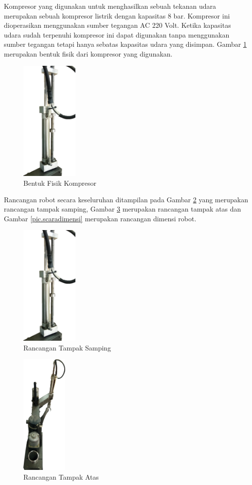 Kompresor yang digunakan untuk menghasilkan sebuah tekanan udara merupakan sebuah kompresor listrik dengan kapasitas 8 bar. Kompresor ini dioperasikan menggunakan sumber tegangan AC 220 Volt. Ketika kapasitas udara sudah terpenuhi kompresor ini dapat digunakan tanpa menggunakan sumber tegangan tetapi hanya sebatas kapasitas udara yang disimpan. Gambar \ref{pic.kompresor} merupakan bentuk fisik dari kompresor yang digunakan.
\begin{figure}[H]
	\centering
	\includegraphics[height=6cm]{gambar/penuamticsementara.jpg}
	\caption{Bentuk Fisik Kompresor}
	\label{pic.kompresor}
\end{figure}

Rancangan robot secara keseluruhan ditampilan pada Gambar \ref{pic.scarasamping} yang merupakan rancangan tampak samping, Gambar \ref{pic.scaraatas} merupakan rancangan tampak atas dan Gambar \ref{pic.scaradimensi} merupakan rancangan dimensi robot. 
\begin{figure}[H]
	\centering
	\includegraphics[height=6cm]{gambar/penuamticsementara.jpg}
	\caption{Rancangan Tampak Samping}
	\label{pic.scarasamping}
\end{figure}

\begin{figure}[H]
	\centering
	\includegraphics[height=6cm]{gambar/scaraatass.png}
	\caption{Rancangan Tampak Atas}
	\label{pic.scaraatas}
\end{figure}

